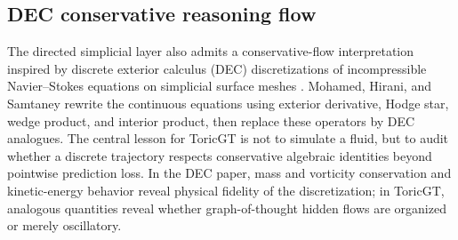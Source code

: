 \documentclass[11pt]{article}
\theoremstyle{definition}
\theoremstyle{plain}
\theoremstyle{remark}
\numberwithin{equation}{section}
\begin{document}
\subsection{DEC conservative reasoning flow}

The directed simplicial layer also admits a conservative-flow interpretation inspired by discrete exterior calculus (DEC) discretizations of incompressible Navier--Stokes equations on simplicial surface meshes \cite{mohamed2016dec}.  Mohamed, Hirani, and Samtaney rewrite the continuous equations using exterior derivative, Hodge star, wedge product, and interior product, then replace these operators by DEC analogues.  The central lesson for ToricGT is not to simulate a fluid, but to audit whether a discrete trajectory respects conservative algebraic identities beyond pointwise prediction loss.  In the DEC paper, mass and vorticity conservation and kinetic-energy behavior reveal physical fidelity of the discretization; in ToricGT, analogous quantities reveal whether graph-of-thought hidden flows are organized or merely oscillatory.
\end{document}
